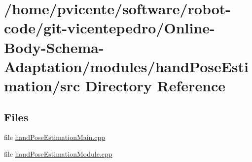 \section{/home/pvicente/software/robot-\/code/git-\/vicentepedro/\+Online-\/\+Body-\/\+Schema-\/\+Adaptation/modules/hand\+Pose\+Estimation/src Directory Reference}
\label{dir_1662ee6f5e2bde6101e5bc391e463279}
\subsection*{Files}
\begin{DoxyCompactItemize}
\item 
file \hyperlink{handPoseEstimationMain_8cpp}{hand\+Pose\+Estimation\+Main.\+cpp}
\item 
file \hyperlink{handPoseEstimationModule_8cpp}{hand\+Pose\+Estimation\+Module.\+cpp}
\end{DoxyCompactItemize}
